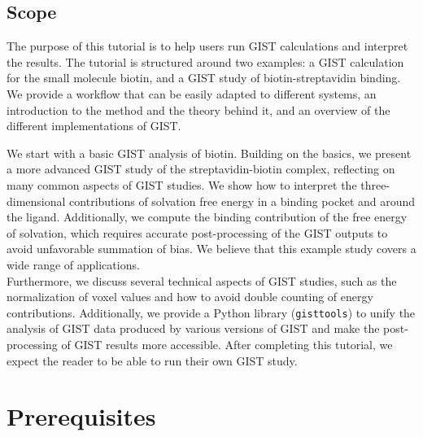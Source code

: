 \documentclass[9pt,tutorial]{livecoms}
\newcommand{\software}{\texttt}
\begin{document}
\subsection{Scope}
The purpose of this tutorial is to help users run GIST calculations and interpret the results.
The tutorial is structured around two examples: a GIST calculation for the small molecule biotin, and a GIST study of biotin-streptavidin binding.
We provide a workflow that can be easily adapted to different systems, an introduction to the method and the theory behind it, and an overview of the different implementations of GIST.

We start with a basic GIST analysis of biotin.
Building on the basics, we present a more advanced GIST study of the streptavidin-biotin complex, reflecting on many common aspects of GIST studies.
We show how to interpret the three-dimensional contributions of solvation free energy in a binding pocket and around the ligand.
Additionally, we compute the binding contribution of the free energy of solvation, which requires accurate post-processing of the GIST outputs to avoid unfavorable summation of bias.
We believe that this example study covers a wide range of applications.\\
Furthermore, we discuss several technical aspects of GIST studies, such as the normalization of voxel values and how to avoid double counting of energy contributions. 
Additionally, we provide a Python library (\software{gisttools}) to unify the analysis of GIST data produced by various versions of GIST and make the post-processing of GIST results more accessible.
After completing this tutorial, we expect the reader to be able to run their own GIST study. 

%

\section{Prerequisites}

\end{document}
